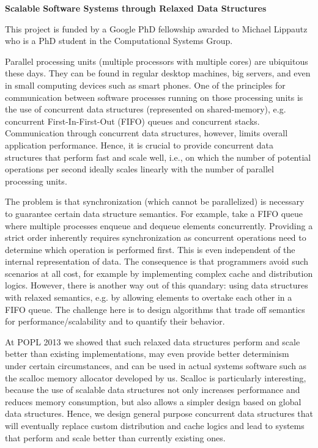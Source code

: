{\bf{Scalable Software Systems through Relaxed Data Structures}}

This project is funded by a Google PhD fellowship awarded to Michael Lippautz who is a PhD student in the Computational Systems Group.

Parallel processing units (multiple processors with multiple cores) are ubiquitous these days. They can be found in regular desktop machines, big servers, and even in small computing devices such as smart phones. One of the principles for communication between software processes running on those processing units is the use of concurrent data structures (represented on shared-memory), e.g. concurrent First-In-First-Out (FIFO) queues and concurrent stacks. Communication through concurrent data structures, however, limits overall application performance. Hence, it is crucial to provide concurrent data structures that perform fast and scale well, i.e., on which the number of potential operations per second ideally scales linearly with the number of parallel processing units.

The problem is that synchronization (which cannot be parallelized) is necessary to guarantee certain data structure semantics. For example, take a FIFO queue where multiple processes enqueue and dequeue elements concurrently. Providing a strict order inherently requires synchronization as concurrent operations need to determine which operation is performed first. This is even independent of the internal representation of data. The consequence is that programmers avoid such scenarios at all cost, for example by implementing complex cache and distribution logics. However, there is another way out of this quandary: using data structures with relaxed semantics, e.g. by allowing elements to overtake each other in a FIFO queue. The challenge here is to design algorithms that trade off semantics for performance/scalability and to quantify their behavior.

At POPL 2013 we showed that such relaxed data structures perform and scale better than existing implementations, may even provide better determinism under certain circumstances, and can be used in actual systems software such as the scalloc memory allocator developed by us. Scalloc is particularly interesting, because the use of scalable data structures not only increases performance and reduces memory consumption, but also allows a simpler design based on global data structures. Hence, we design general purpose concurrent data structures that will eventually replace custom distribution and cache logics and lead to systems that perform and scale better than currently existing ones.